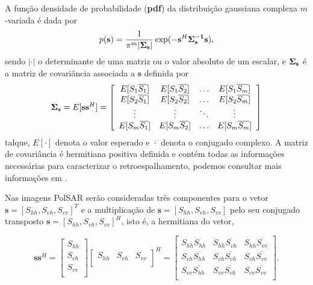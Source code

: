 A função densidade de probabilidade ({\bf pdf}) da distribuição gaussiana complexa $m$-variada é dada por
\begin{equation}\label{cap_acf_4}
    p({\bf s})=\frac{1}{\pi^m|\bf{\Sigma}_{{\bf s}}|}\exp(-{\bf s}^{H}\bf{\Sigma}_{{\bf s}}^{-1}{\bf s}), 
\end{equation}
sendo $|\cdot|$ o determinante de uma matriz ou o valor absoluto de um escalar, e $\mathbf{\Sigma}_{\bf{s}}$ é a matriz de covariância associada a $\mathbf{s}$ definida por
\begin{equation}\label{cap_acf_5}
	{\bf \Sigma_{{\bf s}}} = E[{\mathbf s}{\mathbf s}^H] = \left[
\begin{array}{cccc}
	E[S_1\overline{S_1}]  & E[{S_1}\overline{S_2}] &\hdots & E[S_1\overline{S_m}] \\
	E[S_2\overline{S_1}]  & E[{S_2}\overline{S_2}] &\hdots &E[S_2\overline{S_m}]\\
        \vdots&\vdots &\ddots &\vdots\\
	E[S_m\overline{S_1}]  & E[S_m\overline{S_2}] &\hdots &E[S_m\overline{S_m}]\\
\end{array}
\right]
\end{equation}
talque, $E[\cdot]$ denota o valor esperado e $\overline{\cdot}$ denota o conjugado complexo. A matriz de covariância é hermitiana positiva definida e contém todas as informações necessárias para caracterizar o retroespalhamento, podemos consultar mais informações em \citep{mfp}. 

Nas imagens PolSAR serão consideradas três componentes para o vetor $\mathbf{s}=[S_{hh},S_{vh},S_{vv}]^T$ e a multiplicação de $\mathbf{s}=[S_{hh},S_{vh},S_{vv}]$ pelo seu conjugado transposto $\mathbf{s}=[S_{hh},S_{vh},S_{vv}]^H$, isto é, a hermitiana do vetor, 

\begin{equation}\label{cap_acf_6}
\mathbf{s}\mathbf{s}^H = \left[
\begin{array}{c}
	S_{hh}      \\
        S_{vh}     \\
	S_{vv}      \\
\end{array}
\right]
\left[
\begin{array}{ccc}
	S_{hh}  & S_{vh}  & S_{vv}      \\
\end{array}
\right]^H = 
\left[
\begin{array}{ccc}
	S_{hh}\overline{S_{hh}} & S_{hh} \overline{S_{vh}} & S_{hh}  \overline{S_{vv}}     \\
	S_{vh} \overline{S_{hh}}  & S_{vh} \overline{S_{vh}}  & S_{vh} \overline{S_{vv}}      \\
	S_{vv} \overline{S_{hh}}  & S_{vv} \overline{S_{vh}}  & S_{vv}  \overline{S_{vv}}     \\
\end{array}
\right].
\end{equation}

